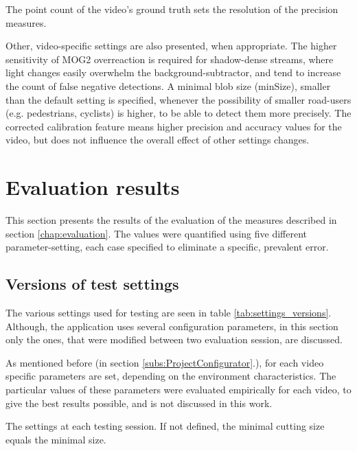 The point count of the video's ground truth sets the resolution of the precision measures.

Other, video-specific settings are also presented, when appropriate.
The higher sensitivity of MOG2 overreaction is required for shadow-dense streams, where light changes easily overwhelm the background-subtractor, and tend to increase the count of false negative detections.
A minimal blob size (minSize), smaller than the default setting is specified, whenever the possibility of smaller road-users (e.g. pedestrians, cyclists) is higher, to be able to detect them more precisely.
The corrected calibration feature means higher precision and accuracy values for the video, but does not influence the overall effect of other settings changes. 
\FloatBarrier

\section{Evaluation results}
This section presents the results of the evaluation of the measures described in section \ref{chap:evaluation}.
The values were quantified using five different parameter-setting, each case specified to eliminate a specific, prevalent error.

\subsection{Versions of test settings}
The various settings used for testing are seen in table \ref{tab:settings_versions}.
Although, the application uses several configuration parameters, in this section only the ones, that were modified between two evaluation session, are discussed.

As mentioned before (in section \ref{subs:ProjectConfigurator}.), for each video specific parameters are set, depending on the environment characteristics.
The particular values of these parameters were evaluated empirically for each video, to give the best results possible, and is not discussed in this work.

\begin{table}[!h]
	\begin{adjustbox}{center}
	\end{adjustbox}
	\caption{The settings at each testing session. If not defined, the minimal cutting size equals the minimal size.}
	\label{tab:settings_versions}
\end{table}

